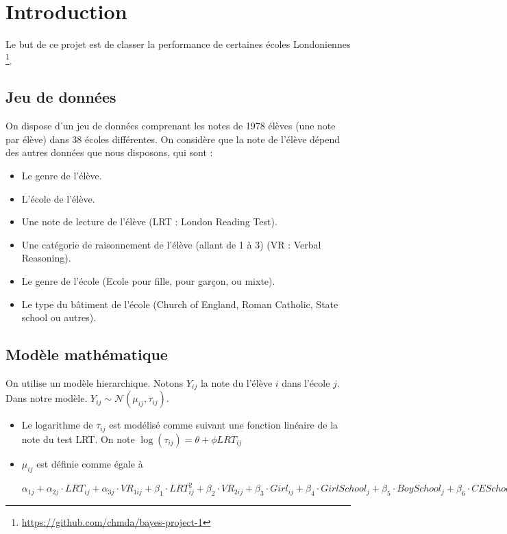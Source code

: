  \section{Introduction}
 Le but de ce projet est de classer la performance de certaines écoles Londoniennes \footnote{\url{https://github.com/chmda/bayes-project-1}}.
 
  \subsection{Jeu de données}
    On dispose d'un jeu de données comprenant les notes de 1978 élèves (une note par élève) dans 38 écoles différentes. On considère que la note de l'élève dépend des autres données que nous disposons, qui sont : 
    \begin{itemize}
        \item Le genre de l'élève.
        \item L'école de l'élève.
        \item Une note de lecture de l'élève (LRT : London Reading Test).
        \item Une catégorie de raisonnement de l'élève (allant de 1 à 3) (VR : Verbal Reasoning).
        
            \item Le genre de l'école (Ecole pour fille, pour garçon, ou mixte).
        \item Le type du bâtiment de l'école (Church of England, Roman Catholic, State school ou autres).
    \end{itemize}
    
    
  \subsection{Modèle mathématique}
    On utilise un modèle hierarchique. Notons $Y_{ij}$ la note du l'élève $i$ dans l'école $j$.
    Dans notre modèle. $Y_{ij} \sim \mathcal{N}( \mu_{ij}, \tau_{ij})$. 
    \begin{itemize}
        \item Le logarithme de $\tau_{ij}$ est modélisé comme suivant une fonction linéaire de la note du test LRT. On note $\log (\tau_{ij}) = \theta + \phi LRT_{ij}$
        \item $\mu_{ij}$ est définie comme égale à 
        
        $\alpha_{1j} 
        + \alpha_{2j}\cdot LRT_{ij} 
        + \alpha_{3j}\cdot VR_{1ij} 
        + \beta_{1}\cdot LRT^{2}_{ij} 
        + \beta_{2}\cdot VR_{2ij} 
        + \beta_{3}\cdot Girl_{ij} 
        + \beta_{4}\cdot GirlSchool_{j} 
        + \beta_{5}\cdot BoySchool_{j} 
        + \beta_{6}\cdot CESchool_{j} 
        + \beta_{7}\cdot RCSchool_{j} 
        + \beta_{8}\cdot OtherSchool_{j}$
    \end{itemize}
    
